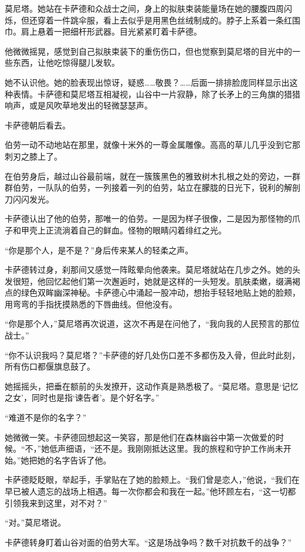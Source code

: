 \documentclass[AutoFakeBold=true]{book}
\begin{document}
莫尼塔。她站在卡萨德和众战士之间，身上的拟肤束装能量场在她的腰腹四周闪烁，但还穿着一件跳伞服，看上去似乎是用黑色丝绒制成的。脖子上系着一条红围巾。肩上悬着一把细杆形武器。目光紧紧盯着卡萨德。

他微微摇晃，感觉到自己拟肤束装下的重伤伤口，但也觉察到莫尼塔的目光中的一些东西，让他吃惊得腿儿发软。

她不认识他。她的脸表现出惊讶，疑惑……敬畏？……后面一排排脸庞同样显示出这种表情。卡萨德和莫尼塔互相凝视，山谷中一片寂静，除了长矛上的三角旗的猎猎响声，或是风吹草地发出的轻微瑟瑟声。

卡萨德朝后看去。

伯劳一动不动地站在那里，就像十米外的一尊金属雕像。高高的草儿几乎没到它那刺刃之膝上了。

在伯劳身后，越过山谷最前端，就在一簇簇黑色的雅致树木扎根之处的旁边，一群群伯劳，一队队的伯劳，一列接着一列的伯劳，站立在朦胧的日光下，锐利的解剖刀闪闪发光。

卡萨德认出了他的伯劳，那唯一的伯劳。一是因为样子很像，二是因为那怪物的爪子和甲壳上正流淌着自己的鲜血。怪物的眼睛闪着绯红之光。

``你是那个人，是不是？''身后传来某人的轻柔之声。

卡萨德转过身，刹那间又感觉一阵眩晕向他袭来。莫尼塔就站在几步之外。她的头发很短，他回忆起他们第一次邂逅时，她就是这样的一头短发。肌肤柔嫩，缀满褐点的绿色双眸幽深神秘。卡萨德心中涌起一股冲动，想抬手轻轻地贴上她的脸颊，用弯弯的手指抚摸熟悉的下唇曲线。但他没有。

``你是那个人，''莫尼塔再次说道，这次不再是在问他了，``我向我的人民预言的那位战士。''

``你不认识我吗？莫尼塔？''卡萨德的好几处伤口差不多都伤及入骨，但此时此刻，所有伤口都偃旗息鼓了。

她摇摇头，把垂在额前的头发撩开，这动作真是熟悉极了。``莫尼塔。意思是`记忆之女'，同时也是指`谏告者'。是个好名字。''

``难道不是你的名字？''

她微微一笑。卡萨德回想起这一笑容，那是他们在森林幽谷中第一次做爱的时候。``不，''她低声细语，``还不是。我刚刚抵达这里。我的旅程和守护工作尚未开始。''她把她的名字告诉了他。

卡萨德眨眨眼，举起手，手掌贴在了她的脸颊上。``我们曾是恋人，''他说，``我们在早已被人遗忘的战场上相遇。每一次你都会和我在一起。''他环顾左右，``这一切都引领我来到这里，对不对？''

``对。''莫尼塔说。

卡萨德转身盯着山谷对面的伯劳大军。``这是场战争吗？数千对抗数千的战争？''
\end{document}
